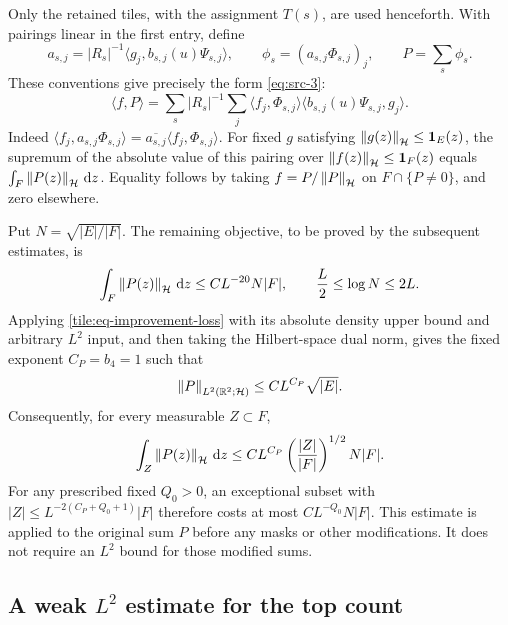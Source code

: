 Only the retained tiles, with the assignment \(T(s)\), are used
henceforth. With pairings linear in the first entry, define
\begin{equation}\label{forest:eq-adjoint}
 a_{s,j}=|R_s|^{-1}
       \langle g_j,b_{s,j}(u)\Psi_{s,j}\rangle,
 \qquad \phi_s=(a_{s,j}\Phi_{s,j})_j,
 \qquad P=\sum_s\phi_s.
\end{equation}
These conventions give precisely the form \eqref{eq:src-3}:
\[
 \langle f,P\rangle
 =\sum_s|R_s|^{-1}\sum_j
       \langle f_j,\Phi_{s,j}\rangle
       \langle b_{s,j}(u)\Psi_{s,j},g_j\rangle.
\]
Indeed \(\langle f_j,a_{s,j}\Phi_{s,j}\rangle
=\overline{a_{s,j}}\langle f_j,\Phi_{s,j}\rangle\).
For fixed \(g\) satisfying
\(\left\|g(z)\right\|_{\mathcal H}\le\mathbf 1_E(z)\), the supremum of
the absolute value of this pairing over
\(\left\|f(z)\right\|_{\mathcal H}\le\mathbf 1_F(z)\) equals
\(\int_F\left\|P(z)\right\|_{\mathcal H}\,\mathrm d z\). Equality follows
by taking \(f=P/\left\|P\right\|_{\mathcal H}\) on
\(F\cap\{P\ne0\}\), and zero elsewhere.

Put \(N=\sqrt{|E|/|F|}\). The remaining objective, to be proved
by the subsequent estimates, is
\begin{equation}\label{eq:src-7}
 \int_F\left\|P(z)\right\|_{\mathcal H}\,\mathrm d z
       \le C L^{-20}N|F|,
 \qquad \frac L2\le\log N\le2L.
\end{equation}
Applying \eqref{tile:eq-improvement-loss} with its absolute density upper bound
and arbitrary \(L^2\) input, and then taking the Hilbert-space
dual norm, gives the fixed exponent \(C_P=b_4=1\) such that
\begin{equation}\label{forest:eq-adjoint-l2}
 \left\|P\right\|_{L^2(\mathbb R^2;\mathcal H)}
       \le C L^{C_P}\sqrt{|E|}.
\end{equation}
Consequently, for every measurable \(Z\subset F\),
\begin{equation}\label{forest:eq-discard}
 \int_Z\left\|P(z)\right\|_{\mathcal H}\,\mathrm d z
 \le C L^{C_P}
       \left(\frac{|Z|}{|F|}\right)^{1/2}N|F|.
\end{equation}
For any prescribed fixed \(Q_0>0\), an exceptional subset with
\(|Z|\le L^{-2(C_P+Q_0+1)}|F|\) therefore costs at most
\(C L^{-Q_0}N|F|\). This estimate is applied to the original
sum \(P\) before any masks or other modifications. It does not
require an \(L^2\) bound for those modified sums.

\subsection{A weak \texorpdfstring{\(L^2\)}{L2} estimate for the top count}

